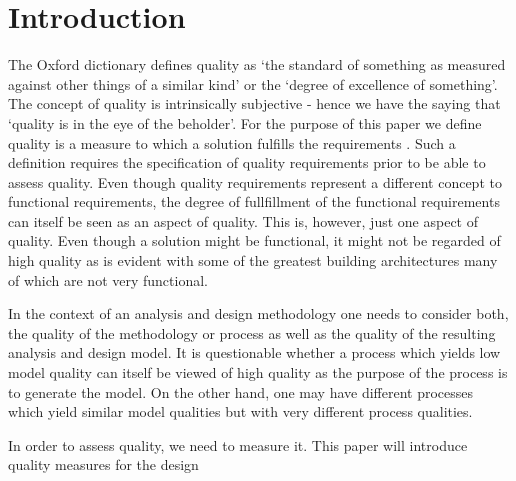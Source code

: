 \section{Introduction}\label{sec:Introduction}

The Oxford dictionary defines quality as `the standard of something as measured against other things of a similar kind' or the `degree of excellence of something'. The concept of quality is intrinsically subjective - hence we have the saying that `quality is in the eye of the beholder'. For the purpose of this paper we define quality is a measure to which a solution fulfills the requirements \cite{lange_managing_2005,lange_improving_2006}. Such a definition requires the specification of quality requirements prior to be able to assess quality. Even though quality requirements represent a different concept to functional requirements, the degree of fullfillment of the functional requirements can itself be seen as an aspect of quality. This is, however, just one aspect of quality. Even though a solution might be functional, it might not be regarded of high quality as is evident with some of the greatest building architectures many of which are not very functional.

In the context of an analysis and design methodology one needs to consider both, the quality of the methodology or process as well as the quality of the resulting analysis and design model. It is questionable whether a process which yields low model quality can itself be viewed of high quality as the purpose of the process is to generate the model. On the other hand, one may have different processes which yield similar model qualities but with very different process qualities. 

In order to assess quality, we need to measure it. This paper will introduce quality measures for the design